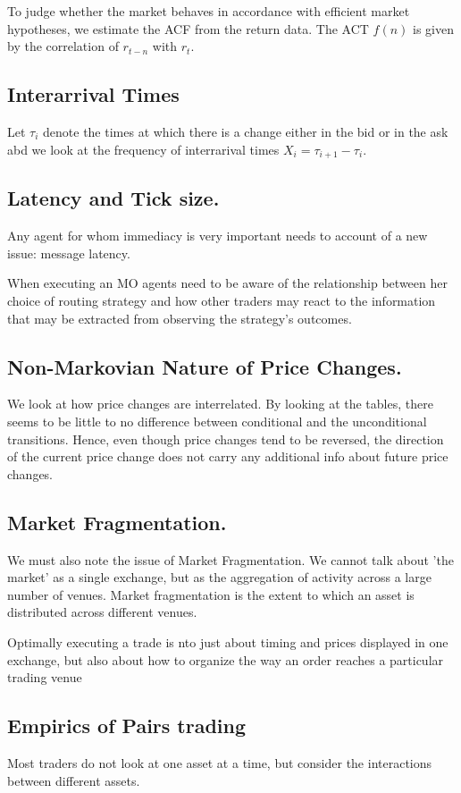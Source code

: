 \documentclass[11pt,a4paper]{article}
\theoremstyle{definition}
\theoremstyle{plain}
\theoremstyle{remark}
\newcommand{\1}{\mathbbm{1}}
\begin{document}
To judge whether the market behaves in accordance with efficient market hypotheses, we estimate the ACF from the return data. 
The ACT $f(n)$ is given by the correlation of $r_{t-n}$ with $r_{t}$. 

\subsection{Interarrival Times}
Let $\tau_i$ denote the times at which there is a change either in the bid or in the ask abd we look at the 
frequency of interrarival times $X_i = \tau_{i+1} - \tau_i$. 

\subsection{Latency and Tick size.} 
Any agent for whom immediacy is very important needs to account of a new issue: message latency. 

When executing an MO agents need to be aware of the relationship between her choice of routing strategy 
and how other traders may react to the information that may be extracted from observing the strategy's outcomes. 

\subsection{Non-Markovian Nature of Price Changes.} 
We look at how price changes are interrelated. By looking at the tables, there seems to be little to no difference between 
conditional and the unconditional transitions. Hence, even though price changes tend to be reversed, the direction of the 
current price change does not carry any additional info about future price changes. 

\subsection{Market Fragmentation.}
We must also note the issue of Market Fragmentation. We cannot talk about 'the market' as a single exchange, 
but as the aggregation of activity across a large number of venues. Market fragmentation is the extent to which an 
asset is distributed across different venues. 

Optimally executing a trade is nto just about timing and prices displayed in one exchange, but also about 
how to organize the way an order reaches a particular trading venue 

\subsection{Empirics of Pairs trading} 
Most traders do not look at one asset at a time, but consider the interactions between different assets. 
\end{document}
